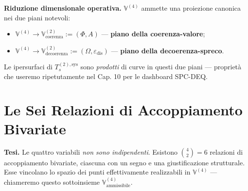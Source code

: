 \Hypoth{} \textbf{Riduzione dimensionale operativa.}
\(\mathbb{V}^{(4)}\) ammette una proiezione canonica nei due piani
notevoli:

\begin{itemize}
\tightlist
\item
  \(\mathbb{V}^{(4)} \to \mathbb{V}^{(2)}_{\text{coerenza}} := (\Phi, A)\)
  --- \textbf{piano della coerenza-valore};
\item
  \(\mathbb{V}^{(4)} \to \mathbb{V}^{(2)}_{\text{decoerenza}} := (\Omega, \varepsilon_{\text{dis}})\)
  --- \textbf{piano della decoerenza-spreco}.
\end{itemize}

Le ipersurfaci di \(T_s^{(2),\text{sys}}\) sono \emph{prodotti} di curve
in questi due piani --- proprietà che useremo ripetutamente nel Cap. 10
per le dashboard SPC-DEQ.



\section{Le Sei Relazioni di Accoppiamento
Bivariate}\label{le-sei-relazioni-di-accoppiamento-bivariate}

\Hypoth{} \textbf{Tesi.} Le quattro variabili \emph{non sono
indipendenti}. Esistono \(\binom{4}{2} = 6\) relazioni di accoppiamento
bivariate, ciascuna con un segno e una giustificazione strutturale. Esse
vincolano lo spazio dei punti effettivamente realizzabili in
\(\mathbb{V}^{(4)}\) --- chiameremo questo sottoinsieme
\(\mathbb{V}^{(4)}_{\text{ammissibile}}\).

